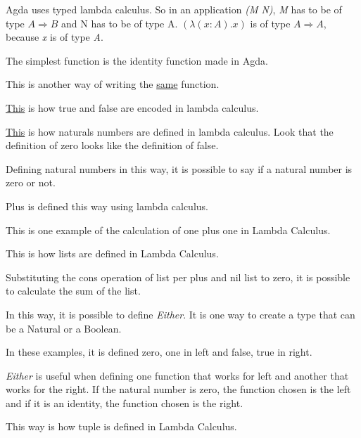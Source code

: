   Agda uses typed lambda calculus.
  So in an application \emph{(M N)}, \emph{M} has to be of type $A \Rightarrow B$ and N has to be of type A.
  $(\lambda (x : A) . x)$ is of type $A \Rightarrow A$, because \emph{x} is of type \emph{A}.

  The simplest function is the identity function made in Agda.

  \label{id2}
  This is another way of writing the \hyperref[id2]{same} function.

  \label{truefalse}
  \hyperref[truefalse]{This} is how true and false are encoded in lambda calculus.

  \label{naturals}
  \hyperref[naturals]{This} is how naturals numbers are defined in lambda calculus.
  Look that the definition of zero looks like the definition of false.

  Defining natural numbers in this way, it is possible to say if a natural number is zero or not.

  Plus is defined this way using lambda calculus.

  This is one example of the calculation of one plus one in Lambda Calculus.

  This is how lists are defined in Lambda Calculus.

  Substituting the cons operation of list per plus and nil list to zero, it is possible to calculate
  the sum of the list.

  In this way, it is possible to define \emph{Either}.
  It is one way to create a type that can be a Natural or a Boolean.

  In these examples, it is defined zero, one in left and false, true in right.

  \emph{Either} is useful when defining one function that works for left and another that works for the right.
  If the natural number is zero, the function chosen is the left and
  if it is an identity, the function chosen is the right. 

  This way is how tuple is defined in Lambda Calculus.

